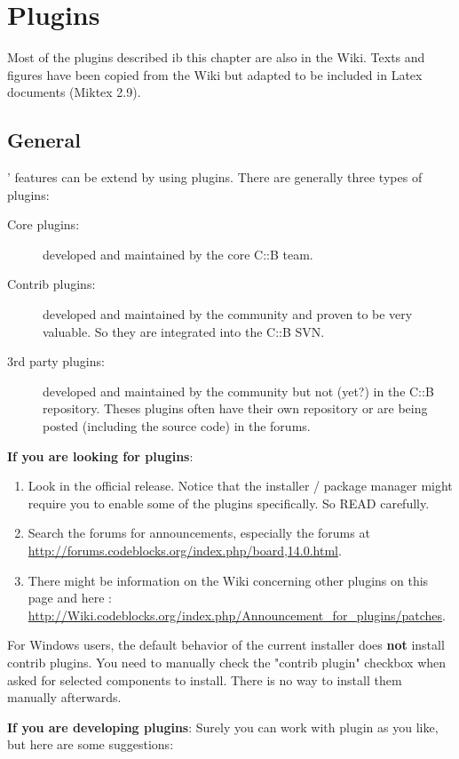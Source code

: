 \chapter{Plugins}\label{sec:plugins}

Most of the plugins described ib this chapter are also in the Wiki. Texts and figures have been copied from the Wiki but adapted to be included in Latex documents (Miktex 2.9).

\section{General}

\codeblocks' features can be extend by using plugins. There are generally three types of plugins:
\begin{description}
\item[Core plugins:] developed and maintained by the core C::B team.
\item[Contrib plugins:] developed and maintained by the community and proven to be very valuable. So they are integrated into the C::B SVN.
\item[3rd party plugins:] developed and maintained by the community but not (yet?) in the C::B repository. Theses plugins often have their own repository or are being posted (including the source code) in the forums.
\end{description}

\textbf{If you are looking for plugins}:
\begin{enumerate}
\item Look in the official release. Notice that the installer / package manager might require you to enable some of the plugins specifically. So READ carefully.
\item Search the forums for announcements, especially the forums at \url{http://forums.codeblocks.org/index.php/board,14.0.html}.
\item There might be information on the Wiki concerning other plugins on this page and here : \url{http://Wiki.codeblocks.org/index.php/Announcement_for_plugins/patches}.
\end{enumerate}

For Windows users, the default behavior of the current installer does \textbf{not} install contrib plugins. You need to manually check the "contrib plugin" checkbox when asked for selected components to install. There is no way to install them manually afterwards.


\textbf{If you are developing plugins}: Surely you can work with plugin as you like, but here are some suggestions:

